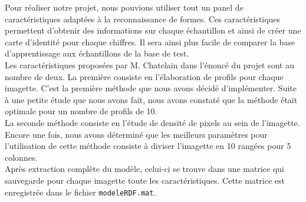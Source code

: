 Pour réaliser notre projet, nous pouvions utiliser tout un panel
de caractéristiques adaptées à la reconnaissance de formes. Ces 
caractéristiques permettent d'obtenir des informations sur chaque
échantillon et ainsi de créer une \og carte d'identité \fg pour
chaque chiffres. Il sera ainsi plus facile de comparer la base
d'apprentissage aux échantillons de la base de test. \\
Les caractéristiques proposées par M. Chatelain dans l'énoncé du
projet sont au nombre de deux. La première consiste en l'élaboration
de profils pour chaque imagette. C'est la première méthode que
nous avons décidé d'implémenter. Suite à une petite étude que nous
avons fait, nous avons constaté que la méthode était optimale pour un
nombre de profils de 10. \\
La seconde méthode consiste en l'étude de densité de pixels au sein de 
l'imagette. Encore une fois, nous avons déterminé que les meilleurs
paramètres pour l'utilisation de cette méthode consiste à diviser 
l'imagette en 10 rangées pour 5 colonnes. \\
Après extraction complète du modèle, celui-ci se trouve dans une 
matrice qui sauvegarde pour chaque imagette toute les caractéristiques.
Cette matrice est enregistrée dans le fichier \texttt{modeleRDF.mat}.